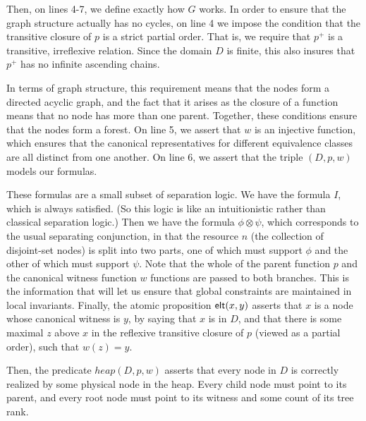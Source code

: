 Then, on lines 4-7, we define exactly how $G$ works. In order to
ensure that the graph structure actually has no cycles, on line 4 we
impose the condition that the transitive closure of $p$ is a strict
partial order. That is, we require that $p^+$ is a transitive,
irreflexive relation. Since the domain $D$ is finite, this also 
insures that $p^+$ has no infinite ascending chains. 

In terms of graph structure, this requirement means that the nodes
form a directed acyclic graph, and the fact that it arises as the
closure of a function means that no node has more than one parent.
Together, these conditions ensure that the nodes form a forest. On
line 5, we assert that $w$ is an injective function, which ensures
that the canonical representatives for different equivalence classes
are all distinct from one another. On line 6, we assert that the
triple $(D, p, w)$ models our formulas.

These formulas are a small subset of separation logic. We have the
formula $I$, which is always satisfied. (So this logic is like an
intuitionistic rather than classical separation logic.) Then we have
the formula $\phi \otimes \psi$, which corresponds to the usual
separating conjunction, in that the resource $n$ (the collection of
disjoint-set nodes) is split into two parts, one of which must support
$\phi$ and the other of which must support $\psi$. Note that the whole
of the parent function $p$ and the canonical witness function $w$
functions are passed to both branches. This is the information that
will let us ensure that global constraints are maintained in local
invariants. Finally, the atomic proposition $\mathsf{elt}({x}, {y})$ asserts that
$x$ is a node whose canonical witness is $y$, by saying that $x$ is in
$D$, and that there is some maximal $z$ above $x$ in the reflexive
transitive closure of $p$ (viewed as a partial order), such that $w(z)
= y$.

Then, the predicate $\mathit{heap}(D, p, w)$ asserts that every node
in $D$ is correctly realized by some physical node in the heap. Every
child node must point to its parent, and every root node must point 
to its witness and some count of its tree rank. 

